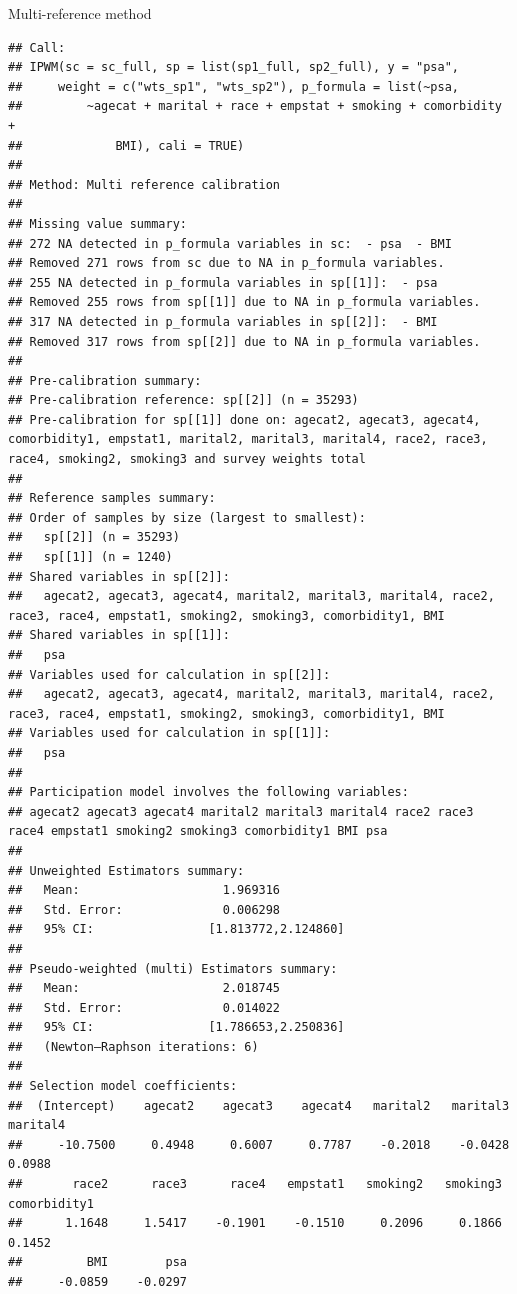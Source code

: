 \documentclass[
  ignorenonframetext,
]{beamer}
\begin{document}
\begin{frame}[fragile]{Multi-reference method}
\begin{verbatim}
## Call:
## IPWM(sc = sc_full, sp = list(sp1_full, sp2_full), y = "psa", 
##     weight = c("wts_sp1", "wts_sp2"), p_formula = list(~psa, 
##         ~agecat + marital + race + empstat + smoking + comorbidity + 
##             BMI), cali = TRUE)
## 
## Method: Multi reference calibration
## 
## Missing value summary:
## 272 NA detected in p_formula variables in sc:  - psa  - BMI
## Removed 271 rows from sc due to NA in p_formula variables.
## 255 NA detected in p_formula variables in sp[[1]]:  - psa
## Removed 255 rows from sp[[1]] due to NA in p_formula variables.
## 317 NA detected in p_formula variables in sp[[2]]:  - BMI
## Removed 317 rows from sp[[2]] due to NA in p_formula variables.
## 
## Pre-calibration summary:
## Pre-calibration reference: sp[[2]] (n = 35293)
## Pre-calibration for sp[[1]] done on: agecat2, agecat3, agecat4, comorbidity1, empstat1, marital2, marital3, marital4, race2, race3, race4, smoking2, smoking3 and survey weights total
## 
## Reference samples summary:
## Order of samples by size (largest to smallest):
##   sp[[2]] (n = 35293)
##   sp[[1]] (n = 1240)
## Shared variables in sp[[2]]:
##   agecat2, agecat3, agecat4, marital2, marital3, marital4, race2, race3, race4, empstat1, smoking2, smoking3, comorbidity1, BMI
## Shared variables in sp[[1]]:
##   psa
## Variables used for calculation in sp[[2]]:
##   agecat2, agecat3, agecat4, marital2, marital3, marital4, race2, race3, race4, empstat1, smoking2, smoking3, comorbidity1, BMI
## Variables used for calculation in sp[[1]]:
##   psa
## 
## Participation model involves the following variables:
## agecat2 agecat3 agecat4 marital2 marital3 marital4 race2 race3 race4 empstat1 smoking2 smoking3 comorbidity1 BMI psa 
## 
## Unweighted Estimators summary:
##   Mean:                    1.969316
##   Std. Error:              0.006298
##   95% CI:                [1.813772,2.124860]
## 
## Pseudo-weighted (multi) Estimators summary:
##   Mean:                    2.018745
##   Std. Error:              0.014022
##   95% CI:                [1.786653,2.250836]
##   (Newton–Raphson iterations: 6)
## 
## Selection model coefficients:
##  (Intercept)    agecat2    agecat3    agecat4   marital2   marital3   marital4
##     -10.7500     0.4948     0.6007     0.7787    -0.2018    -0.0428     0.0988
##       race2      race3      race4   empstat1   smoking2   smoking3 comorbidity1
##      1.1648     1.5417    -0.1901    -0.1510     0.2096     0.1866       0.1452
##         BMI        psa
##     -0.0859    -0.0297
\end{verbatim}
\end{frame}
\end{document}
